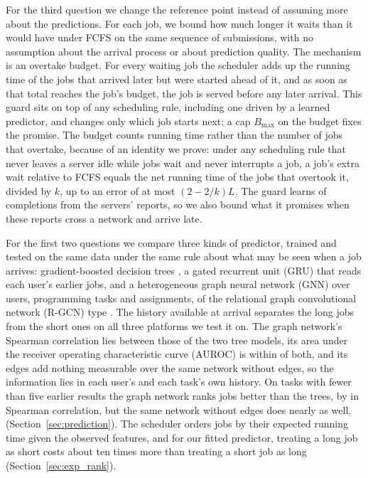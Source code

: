 For the third question we change the reference point instead of assuming more about the
predictions. For each job, we bound how much longer it waits than it would have under
FCFS on the same sequence of submissions, with no assumption about the arrival process or
about prediction quality. The mechanism is an overtake budget. For every waiting job the
scheduler adds up the running time of the jobs that arrived later but were started ahead
of it, and as soon as that total reaches the job's budget, the job is served before any
later arrival. This guard sits on top of any scheduling rule, including one driven by a
learned predictor, and changes only which job starts next; a cap $B_{\max}$ on the budget
fixes the promise. The budget counts running time rather than the number of jobs that
overtake, because of an identity we prove: under any scheduling rule that never leaves a
server idle while jobs wait and never interrupts a job, a job's extra wait relative to
FCFS equals the net running time of the jobs that overtook it, divided by $k$, up to an
error of at most $(2-2/k)L$. The guard learns of completions from the servers' reports, so
we also bound what it promises when these reports cross a network and arrive late.

For the first two questions we compare three kinds of predictor, trained and tested on
the same data under the same rule about what may be seen when a job arrives:
gradient-boosted decision trees \cite{ke2017lightgbm}, a gated recurrent unit (GRU) that
reads each user's earlier jobs, and a heterogeneous graph neural network (GNN) over users,
programming tasks and assignments, of the relational graph convolutional network (R-GCN)
type \cite{schlichtkrull2018rgcn}. The history available at arrival separates the long
jobs from the short ones on all three platforms we test it on. The graph network's Spearman
correlation lies between those of the two tree models, its area under the receiver
operating characteristic curve (AUROC) is within 
of both, and its edges add nothing measurable over the
same network without edges, so the information lies in each user's and each task's own
history. On tasks with fewer than five earlier results the graph network ranks jobs better
than the trees, by  in Spearman correlation, but the same network without
edges does nearly as well,  (Section~\ref{sec:prediction}). The scheduler orders jobs by their expected running time
given the observed features, and for our fitted predictor, treating a long job as
short costs about ten times more than treating a short job as long
(Section~\ref{sec:exp_rank}).

